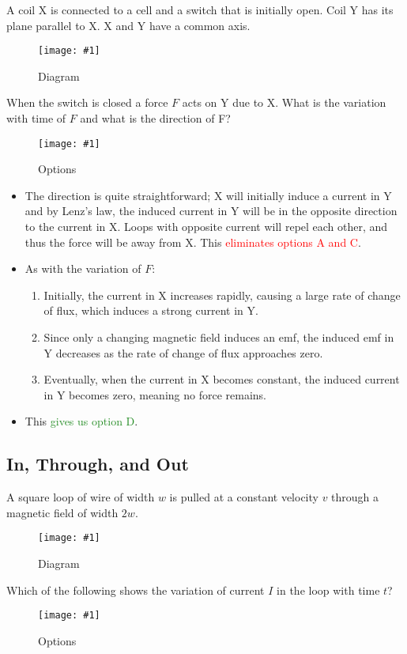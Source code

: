 \documentclass[a4paper,12pt]{article}
\newcommand{\img}[4]{\begin{center}
  \begin{figure}[H]
    \centering
    \texttt{[image: \#1]}
    \caption{#3}
    \label{fig:#4}
  \end{figure}
\end{center}}
\begin{document}
A coil X is connected to a cell and a switch that is initially open. Coil Y has its plane parallel to X. X and Y have a common axis.

\img{ex/2.png}{0.45}{Diagram}{coilxy}

When the switch is closed a force $F$ acts on Y due to X.
What is the variation with time of $F$ and what is the direction of F?

\img{ex/3.png}{0.7}{Options}{Options}

\begin{itemize}
  \item The direction is quite straightforward; X will initially induce a current in Y and by Lenz's law, the induced current in Y will be in the opposite direction to the current in X. Loops with opposite current will repel each other, and thus the force will be away from X. This \textcolor{red}{eliminates options A and C}.
  \item As with the variation of $F$:
        \begin{enumerate}
          \item Initially, the current in X increases rapidly, causing a large rate of change of flux, which induces a strong current in Y.
          \item Since only a changing magnetic field induces an emf, the induced emf in Y decreases as the rate of change of flux approaches zero.
          \item Eventually, when the current in X becomes constant, the induced current in Y becomes zero, meaning no force remains.
        \end{enumerate}
  \item This \textcolor{ForestGreen}{gives us option D}.

\end{itemize}

\pagebreak

\subsection{In, Through, and Out}


A square loop of wire of width $w$ is pulled at a constant velocity $v$ through a magnetic field of width $2w$.

\img{ex/4.png}{0.6}{Diagram}{loop}

Which of the following shows the variation of current $I$ in the loop with time $t$?

\img{ex/5.png}{0.7}{Options}{Options}
\end{document}
